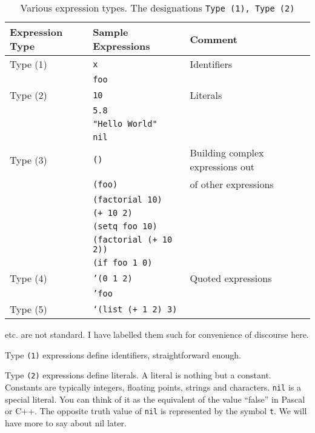 \documentclass[10pt]{article}
\begin{document}
\begin{table}[tb]
  \centering
  \begin{tabular}{|l|l|l|} \hline
    Expression Type & Sample Expressions & Comment     \\ \hline
    Type (1) & \texttt{x}                & Identifiers \\
             & \texttt{foo}              &             \\ \hline
    Type (2) & \texttt{10}               & Literals    \\ 
             & \texttt{5.8}              &             \\
             & \texttt{"Hello World"}    &             \\
             & \texttt{nil}              &             \\ \hline
    Type (3) & \texttt{()}               & Building complex expressions out \\ 
             & \texttt{(foo)}            & of other expressions              \\
             & \texttt{(factorial 10)}   &             \\
             & \texttt{(+ 10 2)}         &             \\
             & \texttt{(setq foo 10)}    &             \\
             & \texttt{(factorial (+ 10 2))} &         \\
             & \texttt{(if foo 1 0)}         &         \\ \hline
    Type (4) & \texttt{'(0 1 2)}             & Quoted expressions           \\
             & \texttt{'foo}                 &         \\ \hline
    Type (5) & \texttt{`(list (+ 1 2) 3)}    &         \\ \hline
  \end{tabular}
  \caption{Various expression types.  The designations \texttt{Type (1),
    Type (2)}} etc. are not standard.  I have labelled them such for
    convenience of discourse here.
  \label{tab:exprt}
\end{table}

Type \texttt{(1)} expressions define identifiers, straightforward enough.

Type \texttt{(2)} expressions define literals.  A literal is nothing but a
constant.  Constants are typically integers, floating points, strings and
characters.  \texttt{nil} is a special literal.  You can think of it as the
equivalent of the value ``false'' in Pascal or C++.  The opposite truth value
of \texttt{nil} is represented by the symbol \texttt{t}.  We will have more to
say about nil later.
\end{document}
